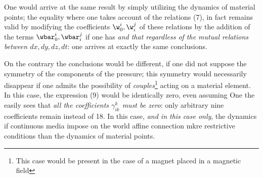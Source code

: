 One would arrive at the same result by simply utilizing the dynamics of material points; the equality
where one takes account of the relations (7), in fact remains valid by modifying the coefficients $\w^i_0, \w^j_i$ of these relations by the addition of the terms $\wbar^i_0 , \wbar^j_i$ if one has
\textit{and that regardless of the mutual relations between $dx,dy,dz,dt$}: one arrives at exactly the same conclusions.

On the contrary the conclusions would be different, if one did not suppose the symmetry of the components of the pressure; this symmetry would necessarily disappear if one admits the possibility of \textit{couples}\footnote{This case would be present in the case of a magnet placed in a magnetic field} acting on a material element. In this case, the expression (9) would be identically zero, even assuming
One the easily sees that \textit{all the coefficients $\gamma^k_{ik}$ must be zero}: only arbitrary nine coefficients remain instead of 18. In this case, \textit{and in this case only}, the dynamics if continuous media impose on the world affine connection mkre restrictive conditions than the dynamics of material points.

